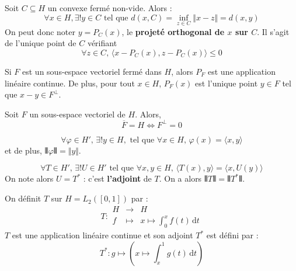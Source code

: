 
  \begin{theorem}
    Soit $C \subseteq H$ un convexe fermé non-vide. Alors :
    \[ \forall x \in H, \exists! y \in C \text{ tel que } d(x, C) = \inf_{z \in C} \Vert x - z \Vert = d(x, y) \]
    On peut donc noter $y = P_C(x)$, le \textbf{projeté orthogonal de $x$ sur $C$}. Il s'agit de l'unique point de $C$ vérifiant
    \[ \forall z \in C, \, \langle x - P_C(x), z - P_C(x) \rangle \leq 0 \]
  \end{theorem}

  \begin{theorem}
    Si $F$ est un sous-espace vectoriel fermé dans $H$, alors $P_F$ est une application linéaire continue. De plus, pour tout $x \in H$, $P_F(x)$ est l'unique point $y \in F$ tel que $x-y \in F^\perp$.
  \end{theorem}

  \begin{corollary}
    Soit $F$ un sous-espace vectoriel de $H$. Alors,
    \[ \overline{F} = H \iff F^\perp = 0 \]
  \end{corollary}

  \begin{theorem}
    \[ \forall \varphi \in H', \, \exists! y \in H, \text{ tel que } \forall x \in H, \, \varphi(x) = \langle x, y \rangle \]
    et de plus, $\VERT \varphi \VERT = \Vert y \Vert$.
  \end{theorem}

  \begin{corollary}
    \[ \forall T \in H', \, \exists! U \in H' \text{ tel que } \forall x, y \in H, \, \langle T(x), y \rangle = \langle x, U(y) \rangle \]
    On note alors $U = T^*$ : c'est \textbf{l'adjoint} de $T$. On a alors $\VERT T \VERT = \VERT T^* \VERT$.
  \end{corollary}


  \begin{example}
    On définit $T$ sur $H = L_2([0,1])$ par :
    \[
    T : \begin{array}{ccc}
      H &\rightarrow& H \\
      f &\mapsto& x \mapsto \int_{0}^{x} f(t) \, \mathrm{d}t
    \end{array}
    \]
    $T$ est une application linéaire continue et son adjoint $T^*$ est défini par :
    \[ T^* : g \mapsto \left(x \mapsto \int_x^1 g(t) \, \mathrm{d}t \right) \]
  \end{example}

